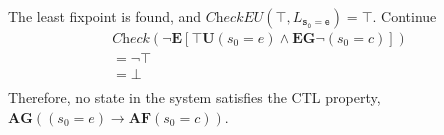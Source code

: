 \documentclass[a4paper,11pt]{article}
\theoremstyle{mytheor}
\begin{document}
The least fixpoint is found, and $\textit{CheckEU}(\top, L_{\mathtt{s_0 = e}}) = \top$. Continue
\begin{equation*}
 \begin{array}{l}
  \textit{Check}(\neg\textbf{E}[\top \textbf{U}(s_0 = e) \wedge \textbf{EG} \neg(s_0 = c)])\\
    = \neg \top \\
    = \bot \\
 \end{array}
\end{equation*}
Therefore, no state in the system satisfies the CTL property,
$\textbf{AG}((s_0 = e) \rightarrow \textbf{AF}(s_0 = c))$.
\end{document}
